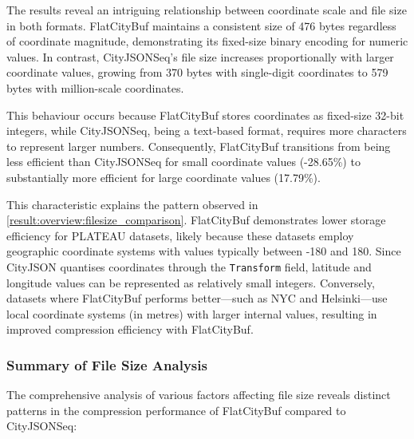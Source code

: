 The results reveal an intriguing relationship between coordinate scale and file size in both formats. FlatCityBuf maintains a consistent size of 476 bytes regardless of coordinate magnitude, demonstrating its fixed-size binary encoding for numeric values. In contrast, CityJSONSeq's file size increases proportionally with larger coordinate values, growing from 370 bytes with single-digit coordinates to 579 bytes with million-scale coordinates.

This behaviour occurs because FlatCityBuf stores coordinates as fixed-size 32-bit integers, while CityJSONSeq, being a text-based format, requires more characters to represent larger numbers. Consequently, FlatCityBuf transitions from being less efficient than CityJSONSeq for small coordinate values (-28.65\%) to substantially more efficient for large coordinate values (17.79\%).

This characteristic explains the pattern observed in \autoref{result:overview:filesize_comparison}. FlatCityBuf demonstrates lower storage efficiency for PLATEAU datasets, likely because these datasets employ geographic coordinate systems with values typically between -180 and 180. Since CityJSON quantises coordinates through the \texttt{Transform} field, latitude and longitude values can be represented as relatively small integers. Conversely, datasets where FlatCityBuf performs better—such as NYC and Helsinki—use local coordinate systems (in metres) with larger internal values, resulting in improved compression efficiency with FlatCityBuf.

\subsubsection{Summary of File Size Analysis}
\label{result:overview:analysis_of_file_size_results:summary}

The comprehensive analysis of various factors affecting file size reveals distinct patterns in the compression performance of FlatCityBuf compared to CityJSONSeq:

